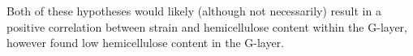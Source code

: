 Both of these hypotheses would likely (although not necessarily) result in a
positive correlation between strain and hemicellulose content within the
G-layer, however \cite{M_ller_2006} found low hemicellulose content in the
G-layer.